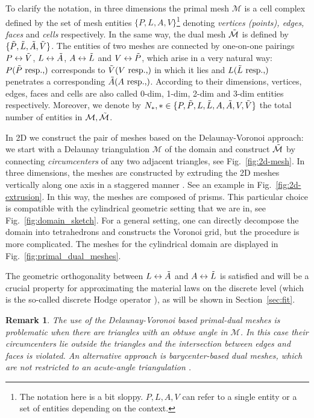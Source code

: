 \documentclass{article}
\newtheorem*{remark}{Remark}
\begin{document}
To clarify the notation, in three dimensions the primal mesh $\mathcal{M}$ is a cell
complex defined by the set of mesh entities $\{P, L, A, V\}$\footnote{The notation here is
  a bit sloppy. $P, L, A, V$ can refer to a single entity or a set of entities depending
  on the context.} denoting \emph{vertices (points), edges, faces} and \emph{cells}
respectively. In the same way, the dual mesh $\Tilde{\mathcal{M}}$ is defined by
$\{\Tilde{P}, \Tilde{L}, \Tilde{A}, \Tilde{V}\}$. The entities of two meshes are
connected by one-on-one pairings $P \leftrightarrow \Tilde{V}$,
$L \leftrightarrow \Tilde{A}$, $A \leftrightarrow \Tilde{L}$ and
$V \leftrightarrow \Tilde{P}$, which arise in a very natural way:
$P(\Tilde{P} \text{ resp.,})$ corresponds to $\Tilde{V}(V \text{ resp.,})$ in which it
lies and $L(\Tilde{L} \text{ resp.,})$ penetrates a corresponding
$\Tilde{A}(A \text{ resp.,})$. According to their dimensions, vertices, edges, faces and
cells are also called 0-dim, 1-dim, 2-dim and 3-dim entities respectively. Moreover, we
denote by $N_\ast, \ast \in \{P, \Tilde{P}, L, \Tilde{L},A, \Tilde{A},V, \Tilde{V}\}$ the
total number of entities in $\mathcal{M}, \Tilde{\mathcal{M}}$.

In 2D we construct the pair of meshes based on the Delaunay-Voronoi approach: we start with a
Delaunay triangulation $\mathcal{M}$ of the domain and construct $\Tilde{\mathcal{M}}$ by
connecting \emph{circumcenters} of any two adjacent triangles, see Fig.~\ref{fig:2d-mesh}.
In three dimensions, the meshes are constructed by extruding the 2D meshes vertically
along one axis in a staggered manner \cite[][Sec.~3.1]{Marrone_2001}. See an example in
Fig.~\ref{fig:2d-extrusion}. In this way, the meshes are composed of prisms. This
particular choice is compatible with the cylindrical geometric setting that we are in, see
Fig.~\ref{fig:domain_sketch}. For a general setting, one can directly decompose the domain
into tetrahedrons and constructs the Voronoi grid, but the procedure is more
complicated. The meshes for the cylindrical domain are displayed in
Fig.~\ref{fig:primal_dual_meshes}.

The geometric orthogonality between $L \leftrightarrow \Tilde{A}$ and
$A \leftrightarrow \Tilde{L}$ is satisfied and will be a crucial property for
approximating the material laws on the discrete level (which is the so-called discrete
Hodge operator \cite{hip_1999, bossavit1999}), as will be shown in Section~\ref{sec:fit}.

\begin{remark}
  The use of the Delaunay-Voronoi based primal-dual meshes is problematic when there are
  triangles with an obtuse angle in $\mathcal{M}$. In this case their circumcenters lie
  outside the triangles and the intersection between edges and faces is violated. An
  alternative approach is barycenter-based dual meshes, which are not restricted to an
  acute-angle triangulation \cite[][Sec.~4.2]{Marrone_2001}.
\end{remark}
\end{document}
